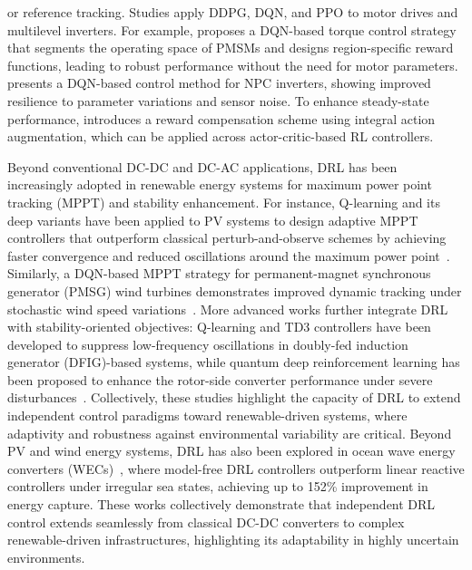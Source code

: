 \noindent
or reference tracking. Studies \cite{book2021transferring, schenke2021deep, traue2020toward, qashqai2023model, weber2023steady, yan2022multiagent,pinthurat2023simultaneous} apply DDPG, DQN, and PPO to motor drives and multilevel inverters. For example, \cite{schenke2021deep} proposes a DQN-based torque control strategy that segments the operating space of PMSMs and designs region-specific reward functions, leading to robust performance without the need for motor parameters. \cite{qashqai2023model} presents a DQN-based control method for NPC inverters, showing improved resilience to parameter variations and sensor noise. To enhance steady-state performance, \cite{weber2023steady} introduces a reward compensation scheme using integral action augmentation, which can be applied across actor-critic-based RL controllers.

Beyond conventional DC-DC and DC-AC applications, DRL has been increasingly adopted in renewable energy systems for maximum power point tracking (MPPT) and stability enhancement. For instance, Q-learning and its deep variants have been applied to PV systems to design adaptive MPPT controllers that outperform classical perturb-and-observe schemes by achieving faster convergence and reduced oscillations around the maximum power point~\cite{wei2015reinforcement}. Similarly, a DQN-based MPPT strategy for permanent-magnet synchronous generator (PMSG) wind turbines demonstrates improved dynamic tracking under stochastic wind speed variations~\cite{arianborna2023mppt}. More advanced works further integrate DRL with stability-oriented objectives: Q-learning and TD3 controllers have been developed to suppress low-frequency oscillations in doubly-fed induction generator (DFIG)-based systems, while quantum deep reinforcement learning has been proposed to enhance the rotor-side converter performance under severe disturbances~\cite{kosuru2022deep,yin2021quantum}. Collectively, these studies highlight the capacity of DRL to extend independent control paradigms toward renewable-driven systems, where adaptivity and robustness against environmental variability are critical. Beyond PV and wind energy systems, DRL has also been explored in ocean wave energy converters (WECs)~\cite{yang2020deep,chen2024control}, where model-free DRL controllers outperform linear reactive controllers under irregular sea states, achieving up to 152\% improvement in energy capture. These works collectively demonstrate that independent DRL control extends seamlessly from classical DC-DC converters to complex renewable-driven infrastructures, highlighting its adaptability in highly uncertain environments.


